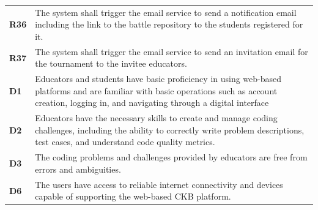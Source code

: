 \begin{table}[h!]
\begin{tabular}{lp{15cm}}
    \textbf{R36} & The system shall trigger the email service to send a notification email including the link to the battle repository to the students registered for it. \\

\textbf{R37} & The system shall trigger the email service to send an invitation email for the tournament to the invitee educators. \\
    
    \hline
    \hline
    \textbf{D1} & Educators and students have basic proficiency in using web-based platforms and are familiar with basic operations such as account creation, logging in, and navigating through a digital interface \\
    \textbf{D2} & Educators have the necessary skills to create and manage coding challenges, including the ability to correctly write problem descriptions, test cases, and understand code quality metrics. \\

    \textbf{D3} & The coding problems and challenges provided by educators are free from errors and ambiguities. \\

    \textbf{D6} & The users have access to reliable internet connectivity and devices capable of supporting the web-based CKB platform. \\
    \hline
  \end{tabular}
\end{table}


\newpage

